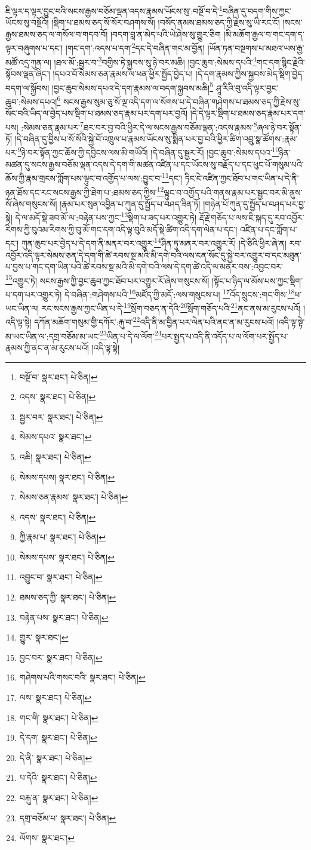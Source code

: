 ཇི་ལྟར་ད་ལྟར་བྱུང་བའི་སངས་རྒྱས་བཅོམ་ལྡན་འདས་རྣམས་ཡོངས་སུ་:བསྔོ་བ་དེ་\footnote{བསྔོ་བ་  སྣར་ཐང་།  པེ་ཅིན། }བཞིན་དུ་བདག་གིས་ཀྱང་ཡོངས་སུ་བསྔོའོ། །སྡིག་པ་ཐམས་ཅད་སོ་སོར་བཤགས་སོ། །བསོད་ནམས་ཐམས་ཅད་ཀྱི་རྗེས་སུ་ཡི་རང་ངོ། །སངས་རྒྱས་ཐམས་ཅད་ལ་གསོལ་བ་གདབ་བོ། །བདག་བླ་ན་མེད་པའི་ཡེ་ཤེས་སུ་གྱུར་ཅིག །མི་མཆོག་རྒྱལ་བ་གང་དག་ད་ལྟར་བཞུགས་པ་དང་། །གང་དག་:འདས་པ་དག་\footnote{འདས་  སྣར་ཐང་།  པེ་ཅིན། }དང་དེ་བཞིན་གང་མ་བྱོན། །ཡོན་ཏན་བསྔགས་པ་མཐའ་ཡས་རྒྱ་མཚོ་འདྲ་ཀུན་ལ། །ཐལ་མོ་:སྦྱར་བ་\footnote{སྦྱར་བར་  སྣར་ཐང་།  པེ་ཅིན། }བགྱིས་ཏེ་སྐྱབས་སུ་ཉེ་བར་མཆི། །བྱང་ཆུབ་:སེམས་དཔའི་\footnote{སེམས་དཔའ་  སྣར་ཐང་། }གང་དག་སྙིང་རྗེའི་སྟོབས་ལྡན་ཞིང་། །དཔའ་བོ་སེམས་ཅན་རྣམས་ལ་ཕན་ཕྱིར་སྤྱོད་བྱེད་པ། །དེ་དག་རྣམས་ཀྱིས་སྐྱབས་མེད་སྡིག་བྱེད་བདག་ལ་སྐྱོབས། །བྱང་ཆུབ་སེམས་དཔའ་དེ་དག་རྣམས་ལ་བདག་སྐྱབས་མཆི།\footnote{འཆི།  སྣར་ཐང་།  པེ་ཅིན། } ཤཱ་རིའི་བུ་འདི་ལྟར་བྱང་ཆུབ་:སེམས་དཔའ།\footnote{སེམས་དཔས།  སྣར་ཐང་།  པེ་ཅིན། } སངས་རྒྱས་སུམ་ཅུ་སོ་ལྔ་འདི་དག་ལ་སོགས་པ་དེ་བཞིན་གཤེགས་པ་ཐམས་ཅད་ཀྱི་རྗེས་སུ་སོང་བའི་ཡིད་ལ་བྱེད་པས་སྡིག་པ་ཐམས་ཅད་རྣམ་པར་དག་པར་བྱའོ། །དེ་དེ་ལྟར་སྡིག་པ་ཐམས་ཅད་རྣམ་པར་དག་པས། :སེམས་ཅན་རྣམ་པར་\footnote{སེམས་ཅན་རྣམས་  སྣར་ཐང་།  པེ་ཅིན། }ཐར་བར་བྱ་བའི་ཕྱིར་དེ་ལ་སངས་རྒྱས་བཅོམ་ལྡན་:འདས་རྣམས་\footnote{འདས་  སྣར་ཐང་།  པེ་ཅིན། }ཞལ་ཉེ་བར་སྟོན་ཏོ། །དེ་བཞིན་དུ་བྱིས་པ་སོ་སོའི་སྐྱེ་བོ་འཁྲུལ་པ་རྣམས་ཡོངས་སུ་སྨིན་པར་བྱ་བའི་ཕྱིར་ཚིག་འབྲུ་སྣ་ཚོགས་:རྣམ་པར་\footnote{ཀྱི་རྣམ་པ་  སྣར་ཐང་།  པེ་ཅིན། }ཉེ་བར་སྟོན་ཀྱང་ཆོས་ཀྱི་དབྱིངས་ལས་མི་གཡོའོ། །དེ་བཞིན་དུ་སྦྱར་རོ། །བྱང་ཆུབ་:སེམས་དཔའ་\footnote{སེམས་དཔས་  སྣར་ཐང་།  པེ་ཅིན། }ཉིན་མཚན་དུ་སངས་རྒྱས་བཅོམ་ལྡན་འདས་དེ་དག་གི་མཚན་འཛིན་པ་དང་ཡོངས་སུ་བརྗོད་པ་དང་ཕུང་པོ་གསུམ་པའི་ཆོས་ཀྱི་རྣམ་གྲངས་ཀློག་པས་ལྟུང་བ་འགྱོད་པ་ལས་:བྱུང་བ་\footnote{འབྱུང་བ་  སྣར་ཐང་།  པེ་ཅིན། }དང་། ཏིང་ངེ་འཛིན་ཀྱང་ཐོབ་པ་གང་ཡིན་པ་དེ་ནི་ཉན་ཐོས་དང་རང་སངས་རྒྱས་ཀྱི་ཐེག་པ་:ཐམས་ཅད་ཀྱིས་\footnote{ཐམས་ཅད་ཀྱི་  སྣར་ཐང་།  པེ་ཅིན། }ལྟུང་བ་འགྱོད་པའི་གནས་རྣམ་པར་སྦྱང་བར་མི་ནུས་སོ་ཞེས་གསུངས་སོ། །རྣམ་པར་སུན་འབྱིན་པ་ཀུན་དུ་སྤྱོད་པ་བཤད་ཟིན་ཏོ། །གཉེན་པོ་ཀུན་དུ་སྤྱོད་པ་བཤད་པར་བྱ་སྟེ། དེ་ལ་མདོ་སྡེ་ཟབ་མོ་ལ་:བརྟེན་པས་ཀྱང་\footnote{བརྟེན་པས་  སྣར་ཐང་།  པེ་ཅིན། }སྡིག་པ་ཟད་པར་འགྱུར་ཏེ། རྡོ་རྗེ་གཅོད་པ་ལས་ཇི་སྐད་དུ་རབ་འབྱོར་རིགས་ཀྱི་བུའམ་རིགས་ཀྱི་བུ་མོ་གང་དག་འདི་ལྟ་བུའི་མདོ་སྡེ་ཚིག་འདི་དག་ལེན་པ་དང་། འཛིན་པ་དང་ཀློག་པ་དང་། ཀུན་ཆུབ་པར་བྱེད་པ་དེ་དག་ནི་མནར་བར་འགྱུར་\footnote{གྱུར་  སྣར་ཐང་། }ཤིན་ཏུ་མནར་བར་འགྱུར་རོ། །དེ་ཅིའི་ཕྱིར་ཞེ་ན། རབ་འབྱོར་འདི་ལྟར་སེམས་ཅན་དེ་དག་གི་ཚེ་རབས་སྔ་མའི་མི་དགེ་བའི་ལས་ངན་སོང་དུ་སྐྱེ་བར་འགྱུར་བ་དང་མཐུན་པ་བྱས་པ་གང་དག་ཡིན་པའི་ཚེ་རབས་སྔ་མའི་མི་དགེ་བའི་ལས་དེ་དག་ཚེ་འདི་ལ་མནར་བས་:འབྱང་བར་\footnote{བྱང་བར་  སྣར་ཐང་།  པེ་ཅིན། }འགྱུར་ཏེ། སངས་རྒྱས་ཀྱི་བྱང་ཆུབ་ཀྱང་ཐོབ་པར་འགྱུར་རོ་ཞེས་གསུངས་སོ། །སྟོང་པ་ཉིད་ལ་མོས་པས་ཀྱང་སྡིག་པ་དག་པར་འགྱུར་ཏེ། དེ་བཞིན་:གཤེགས་པའི་\footnote{གཤེགས་པའི་གསང་བའི་  སྣར་ཐང་།  པེ་ཅིན། }མཛོད་ཀྱི་མདོ་:ལས་གསུངས་པ། \footnote{ལས་  སྣར་ཐང་།  པེ་ཅིན། }འོད་སྲུངས་:གང་གིས་\footnote{གང་གི་  སྣར་ཐང་།  པེ་ཅིན། }ཕ་ཡང་ཡིན་ལ། རང་སངས་རྒྱས་ཀྱང་ཡིན་པ་དེ་\footnote{དེ་དག་  སྣར་ཐང་།  པེ་ཅིན། }སྲོག་བཅད་ན་དེའི་\footnote{དེ་ནི་  སྣར་ཐང་།  པེ་ཅིན། }སྲོག་གཅོད་པའི་\footnote{པ་དེའི་  སྣར་ཐང་།  པེ་ཅིན། }ནང་ནས་མ་རུངས་པའོ། །འདི་ལྟ་སྟེ། དཀོན་མཆོག་གསུམ་གྱི་དཀོར་:རྐུ་བ་\footnote{བརྐུ་ན་  སྣར་ཐང་།  པེ་ཅིན། }འདི་ནི་མ་བྱིན་པར་ལེན་པའི་ནང་ན་མ་རུངས་པའོ། །འདི་ལྟ་སྟེ་མ་ཡང་ཡིན་ལ་:དགྲ་བཅོམ་མ་ཡང་\footnote{དགྲ་བཅོམ་པ་  སྣར་ཐང་།  པེ་ཅིན། }ཡིན་པ་དེ་ལ་ལོག་\footnote{ལོགས་  སྣར་ཐང་། }པར་སྤྱད་པ་འདི་ནི་འདོད་པ་ལ་ལོག་པར་སྤྱོད་པ་རྣམས་ཀྱི་ནང་ན་མ་རུངས་པའོ། །འདི་ལྟ་སྟེ། 